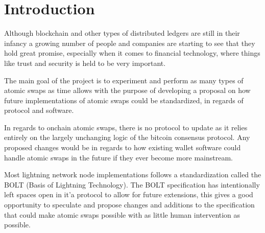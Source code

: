 
\chapter{Introduction}
Although blockchain and other types of distributed ledgers are still in their
infancy a growing number of people and companies are starting to see that they
hold great promise, especially when it comes to financial technology, where
things like trust and security is held to be very important.







The main goal of the project is to experiment and perform as many types of atomic swaps as time allows with the purpose of developing a proposal on how future implementations of atomic swaps could be standardized, in regards of protocol and software.

In regards to onchain atomic swaps, there is no protocol to update as it relies entirely on the largely unchanging logic of the bitcoin consensus protocol. Any proposed changes would be in regards to how existing wallet software could handle atomic swaps in the future if they ever become more mainstream.

Most lightning network node implementations follows a standardization called the BOLT (Basis of Lightning Technology). The BOLT specification has intentionally left spaces open in it'a protocol to allow for future extensions, this gives a good opportunity to speculate and propose changes and additions to the specification that could make atomic swaps possible with as little human intervention as possible.